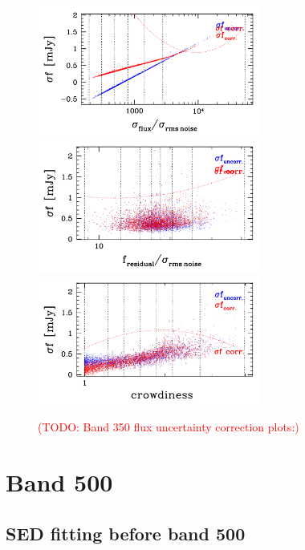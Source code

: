 \documentclass[11pt,a4paper]{article}
\begin{document}
\begin{figure}[H]
	\caption{
		\textcolor{red}{(TODO: Band 350 flux uncertainty correction plots:)}
	}
	\includegraphics[width=0.65\textwidth]{galsim_350_dfcorr_1}
	\includegraphics[width=0.65\textwidth]{galsim_350_dfcorr_2}
	\includegraphics[width=0.65\textwidth]{galsim_350_dfcorr_3}
\end{figure}


\clearpage

\section{Band 500}

\subsection{SED fitting before band 500}
\label{Band500_Galsed}
\end{document}
